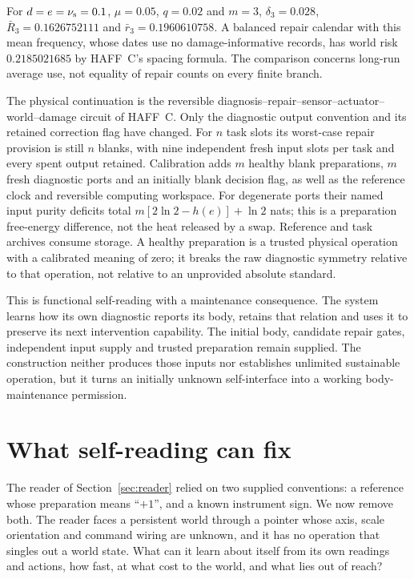 \documentclass[11pt,a4paper]{article}
\begin{document}
For $d=e=\nu_{\rm s}=0.1$, $\mu=0.05$, $q=0.02$ and $m=3$,
$\delta_3=0.028$, $\bar R_3=0.1626752111$ and
$\bar r_3=0.1960610758$. A balanced repair calendar with this mean frequency, whose dates use no damage-informative records, has world risk $0.2185021685$ by HAFF~C's spacing formula. The comparison concerns long-run average use, not equality of repair counts on every finite branch.

The physical continuation is the reversible diagnosis--repair--sensor--actuator--world--damage circuit of HAFF~C. Only the diagnostic output convention and its retained correction flag have changed. For $n$ task slots its worst-case repair provision is still $n$ blanks, with nine independent fresh input slots per task and every spent output retained. Calibration adds $m$ healthy blank preparations, $m$ fresh diagnostic ports and an initially blank decision flag, as well as the reference clock and reversible computing workspace. For degenerate ports their named input purity deficits total
$m[2\ln2-h(e)]+\ln2$ nats; this is a preparation free-energy difference, not the heat released by a swap. Reference and task archives consume storage. A healthy preparation is a trusted physical operation with a calibrated meaning of zero; it breaks the raw diagnostic symmetry relative to that operation, not relative to an unprovided absolute standard.

This is functional self-reading with a maintenance consequence. The system learns how its own diagnostic reports its body, retains that relation and uses it to preserve its next intervention capability. The initial body, candidate repair gates, independent input supply and trusted preparation remain supplied. The construction neither produces those inputs nor establishes unlimited sustainable operation, but it turns an initially unknown self-interface into a working body-maintenance permission.

\section{What self-reading can fix}\label{sec:reach}

The reader of Section~\ref{sec:reader} relied on two supplied conventions: a reference whose preparation means ``$+1$'', and a known instrument sign. We now remove both. The reader faces a persistent world through a pointer whose axis, scale orientation and command wiring are unknown, and it has no operation that singles out a world state. What can it learn about itself from its own readings and actions, how fast, at what cost to the world, and what lies out of reach?
\end{document}
